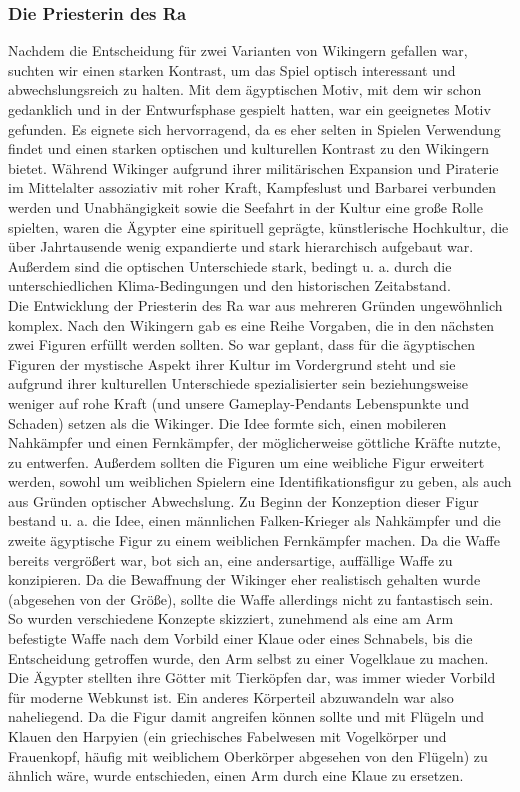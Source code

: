 \documentclass[extern,palatino]{cgBA}
\begin{document}
\subsubsection{Die Priesterin des Ra}
Nachdem die Entscheidung für zwei Varianten von Wikingern gefallen war, suchten wir einen starken Kontrast, um das Spiel optisch interessant und abwechslungsreich zu halten. Mit dem ägyptischen Motiv, mit dem wir schon gedanklich und in der Entwurfsphase gespielt hatten, war ein geeignetes Motiv gefunden. Es eignete sich hervorragend, da es eher selten in Spielen Verwendung findet und einen starken optischen und kulturellen Kontrast zu den Wikingern bietet. Während Wikinger aufgrund ihrer militärischen Expansion und Piraterie im Mittelalter assoziativ mit roher Kraft, Kampfeslust und Barbarei verbunden werden und Unabhängigkeit sowie die Seefahrt in der Kultur eine große Rolle spielten, waren die Ägypter eine spirituell geprägte, künstlerische Hochkultur, die über Jahrtausende wenig expandierte und stark hierarchisch aufgebaut war. Außerdem sind die optischen Unterschiede stark, bedingt u. a. durch die unterschiedlichen Klima-Bedingungen und den historischen Zeitabstand. 
\\Die Entwicklung der Priesterin des Ra war aus mehreren Gründen ungewöhnlich komplex.
Nach den Wikingern gab es eine Reihe Vorgaben, die in den nächsten zwei Figuren erfüllt werden sollten. So war geplant, dass für die ägyptischen Figuren der mystische Aspekt ihrer Kultur im Vordergrund steht und sie aufgrund ihrer kulturellen Unterschiede spezialisierter sein beziehungsweise weniger auf rohe Kraft (und unsere Gameplay-Pendants Lebenspunkte und Schaden) setzen als die Wikinger. Die Idee formte sich, einen mobileren Nahkämpfer und einen Fernkämpfer, der möglicherweise göttliche Kräfte nutzte, zu entwerfen. Außerdem sollten die Figuren um eine weibliche Figur erweitert werden, sowohl um weiblichen Spielern eine Identifikationsfigur zu geben, als auch aus Gründen optischer Abwechslung. Zu Beginn der Konzeption dieser Figur bestand u. a. die Idee, einen männlichen Falken-Krieger als Nahkämpfer und die zweite ägyptische Figur zu einem weiblichen Fernkämpfer machen. Da die Waffe bereits vergrößert war, bot sich an, eine andersartige, auffällige Waffe zu konzipieren. Da die Bewaffnung der Wikinger eher realistisch gehalten wurde (abgesehen von der Größe), sollte die Waffe allerdings nicht zu fantastisch sein. So wurden verschiedene Konzepte skizziert, zunehmend als eine am Arm befestigte Waffe nach dem Vorbild einer Klaue oder eines Schnabels, bis die Entscheidung getroffen wurde, den Arm selbst zu einer Vogelklaue zu machen. Die Ägypter stellten ihre Götter mit Tierköpfen dar, was immer wieder Vorbild für moderne Webkunst ist. Ein anderes Körperteil abzuwandeln war also naheliegend. Da die Figur damit angreifen können sollte und mit Flügeln und Klauen den Harpyien (ein griechisches Fabelwesen mit Vogelkörper und Frauenkopf, häufig mit weiblichem Oberkörper abgesehen von den Flügeln) zu ähnlich wäre, wurde entschieden, einen Arm durch eine Klaue zu ersetzen.
\end{document}
